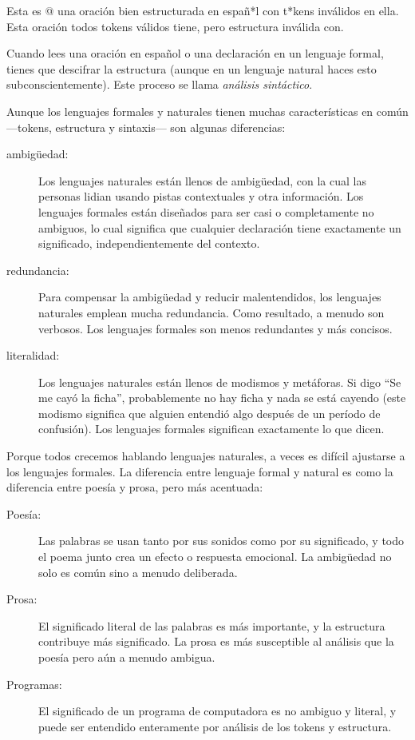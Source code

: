 \documentclass[12pt,letterpaper]{book}
\begin{document}
Esta es @ una oración bien estructurada en españ*l con t*kens inválidos en ella. Esta oración todos tokens válidos tiene, pero estructura inválida con.

Cuando lees una oración en español o una declaración en un lenguaje formal, tienes que descifrar la estructura (aunque en un lenguaje natural haces esto subconscientemente). Este proceso se llama \textit{análisis sintáctico}.

Aunque los lenguajes formales y naturales tienen muchas características en común ---tokens, estructura y sintaxis--- son algunas diferencias:

\begin{description}
\item[ambigüedad:] Los lenguajes naturales están llenos de ambigüedad, con la cual las personas lidian usando pistas contextuales y otra información. Los lenguajes formales están diseñados para ser casi o completamente no ambiguos, lo cual significa que cualquier declaración tiene exactamente un significado, independientemente del contexto.

\item[redundancia:] Para compensar la ambigüedad y reducir malentendidos, los lenguajes naturales emplean mucha redundancia. Como resultado, a menudo son verbosos. Los lenguajes formales son menos redundantes y más concisos.

\item[literalidad:] Los lenguajes naturales están llenos de modismos y metáforas. Si digo ``Se me cayó la ficha'', probablemente no hay ficha y nada se está cayendo (este modismo significa que alguien entendió algo después de un período de confusión). Los lenguajes formales significan exactamente lo que dicen.
\end{description}

Porque todos crecemos hablando lenguajes naturales, a veces es difícil ajustarse a los lenguajes formales. La diferencia entre lenguaje formal y natural es como la diferencia entre poesía y prosa, pero más acentuada:

\begin{description}
\item[Poesía:] Las palabras se usan tanto por sus sonidos como por su significado, y todo el poema junto crea un efecto o respuesta emocional. La ambigüedad no solo es común sino a menudo deliberada.

\item[Prosa:] El significado literal de las palabras es más importante, y la estructura contribuye más significado. La prosa es más susceptible al análisis que la poesía pero aún a menudo ambigua.

\item[Programas:] El significado de un programa de computadora es no ambiguo y literal, y puede ser entendido enteramente por análisis de los tokens y estructura.
\end{description}
\end{document}
